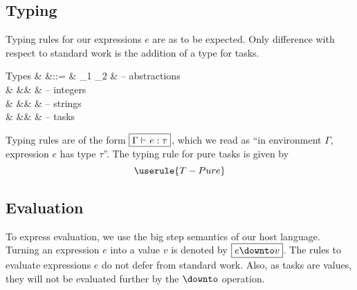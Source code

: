 \subsection{Typing}

Typing rules for our expressions $e$ are as to be expected.
Only difference with respect to standard work is the addition of a type for tasks.
\begin{grammar}
  Types
    & \tau &::= & \tau_1 \to \tau_2 & – abstractions \\
    &      &\mid& \Int              & – integers \\
    &      &\mid& \String           & – strings \\
    &      &\mid& \Task \tau        & – tasks \\
\end{grammar}
Typing rules are of the form $\boxed{\Gamma \vdash e : \tau}$,
which we read as \enquote{in environment $\Gamma$, expression $e$ has type $\tau$}.
The typing rule for pure tasks is given by
\begin{equation*}
  \userule{T-Pure}
\end{equation*}


\subsection{Evaluation}

To express evaluation,
we use the big step semantics of our host language.
Turning an expression $e$ into a value $v$ is denoted by $\boxed{e \downto v}$.
The rules to evaluate expressions $e$ do not defer from standard work.
Also, as tasks are values, they will not be evaluated further by the $\downto$ operation.
